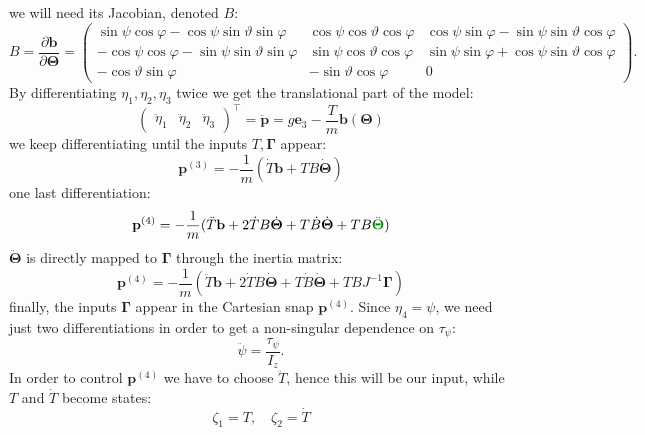 \documentclass[10pt, a4paper]{report}
\begin{document}
we will need its Jacobian, denoted $B$:\begin{equation}
    B=\frac{\partial\mathbf b}{\partial\boldsymbol{\Theta}}=\begin{pmatrix}
\sin\psi \cos\varphi - \cos\psi \sin\vartheta \sin\varphi & \cos\psi \cos\vartheta \cos\varphi & \cos\psi \sin\varphi - \sin\psi \sin\vartheta \cos\varphi \\
-\cos\psi \cos\varphi - \sin\psi \sin\vartheta \sin\varphi & \sin\psi \cos\vartheta \cos\varphi & \sin\psi \sin\varphi + \cos\psi \sin\vartheta \cos\varphi \\
-\cos\vartheta \sin\varphi & -\sin\vartheta \cos\varphi & 0
\end{pmatrix}.
\end{equation}
By differentiating $\eta_1,\eta_2,\eta_3$ twice we get the translational part of the model:\begin{equation}
    \begin{pmatrix}
        \ddot\eta_1&\ddot\eta_2&\ddot\eta_3
    \end{pmatrix}^\top=\ddot{\mathbf p}=g\mathbf e_3-\frac{T}{m}\mathbf b(\boldsymbol{\Theta})
\end{equation}
we keep differentiating until the inputs $T,\boldsymbol{\Gamma}$ appear:\begin{equation}
    \mathbf p^{(3)}=-\frac{1}{m}(\dot T\mathbf b+TB\dot{\boldsymbol{\Theta}})
\end{equation}
one last differentiation:\begin{equation}
     \mathbf p^{(4)}=-\frac{1}{m}(\ddot T\mathbf b+2\dot T B \dot{\boldsymbol{\Theta}}+T\dot B \dot{\boldsymbol{\Theta}}+TB\greenText{\ddot{\boldsymbol{\Theta}}})
\end{equation}
$\ddot{\boldsymbol{\Theta}}$ is directly mapped to $\boldsymbol{\Gamma}$ through the inertia matrix:\begin{equation}
     \mathbf p^{(4)}=-\frac{1}{m}(\ddot T\mathbf b+2\dot T B \dot{\boldsymbol{\Theta}}+T\dot B \dot{\boldsymbol{\Theta}}+TBJ^{-1}\boldsymbol{\Gamma})
\end{equation}
finally, the inputs $\boldsymbol{\Gamma}$ appear in the Cartesian snap $\mathbf p^{(4)}$. Since $\eta_4=\psi$, we need just two differentiations in order to get a non-singular dependence on $\tau_\psi$:\begin{equation}
    \ddot\psi=\frac{\tau_\psi}{I_z}.
\end{equation}
In order to control $\mathbf p^{(4)}$ we have to choose $\ddot T$, hence this will be our input, while $T$ and $\dot T$ become states:\begin{equation}
    \zeta_1=T,\quad\zeta_2=\dot T  
\end{equation}
\end{document}
